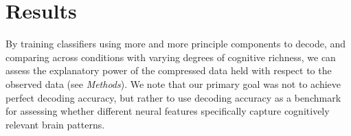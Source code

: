 \documentclass[english]{article}
\begin{document}




\section*{Results}
By training classifiers using more and more principle components to decode, and comparing across conditions with varying degrees of cognitive richness, we can assess the explanatory power of the compressed data held with respect to the observed data (see \textit{Methods}). We note that our primary goal was not to achieve perfect decoding accuracy, but rather to use decoding accuracy as a benchmark for assessing whether different neural features specifically capture cognitively relevant brain patterns.
\end{document}
